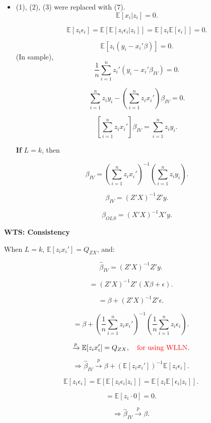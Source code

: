 \documentclass[12pt, oneside]{article}
\begin{document}
\begin{itemize}
    \item (1), (2), (3) were replaced with (7).
    \[
    \mathbb{E}[x_i | z_i] = 0.
    \]

    \[
    \mathbb{E}[z_i \epsilon_i] = \mathbb{E}[\mathbb{E}[z_i \epsilon_i | z_i]] = \mathbb{E}[z_i \mathbb{E}[\epsilon_i]] = 0.
    \]

    \[
    \mathbb{E}[z_i (y_i - x_i' \beta)] = 0.
    \]
    (In sample),
    \[
    \frac{1}{n} \sum_{i=1}^{n} z_i' (y_i - x_i' \beta_{IV}) = 0.
    \]

    \[
    \sum_{i=1}^{n} z_i y_i - \left( \sum_{i=1}^{n} z_i x_i' \right) \beta_{IV} = 0.
    \]
    
    \[
    \left[ \sum_{i=1}^{n} z_i x_i' \right] \beta_{IV} = \sum_{i=1}^{n} z_i y_i.
    \]

    \textbf{If} \( L = k \), then

    \[
    \beta_{IV} = \left( \sum_{i=1}^{n} z_i x_i' \right)^{-1} \left( \sum_{i=1}^{n} z_i y_i \right).
    \]

    \[
    \beta_{IV} = (Z'X)^{-1} Z' y.
    \]

    \[
    \beta_{OLS} = (X'X)^{-1} X' y.
    \]

\end{itemize}

\textbf{WTS: Consistency}

When \( L = k \), \( \mathbb{E}[z_i x_i'] = Q_{ZX} \), and:

\[
\hat{\beta}_{IV} = (Z'X)^{-1} Z' y.
\]

\[
= (Z'X)^{-1} Z' (X\beta + \epsilon).
\]

\[
= \beta + (Z'X)^{-1} Z' \epsilon.
\]

\[
= \beta + \left( \frac{1}{n} \sum_{i=1}^{n} z_i x_i' \right)^{-1} \left( \frac{1}{n} \sum_{i=1}^{n} z_i \epsilon_i \right).
\]

\[
\xrightarrow{p} \mathbb{E}[z_i x_i'] = Q_{ZX}, \quad \textcolor{red}{\text{for using WLLN}}.
\]

\[
\Rightarrow \hat{\beta}_{IV} \xrightarrow{p} \beta + (\mathbb{E}[z_i x_i'])^{-1} \mathbb{E}[z_i \epsilon_i].
\]

\[
\mathbb{E}[z_i \epsilon_i] = \mathbb{E}[\mathbb{E}[z_i \epsilon_i | z_i]] = \mathbb{E}[z_i \mathbb{E}[\epsilon_i | z_i]].
\]

\[
= \mathbb{E}[z_i \cdot 0] = 0.
\]

\[
\Rightarrow \hat{\beta}_{IV} \xrightarrow{p} \beta.
\]
\end{document}
